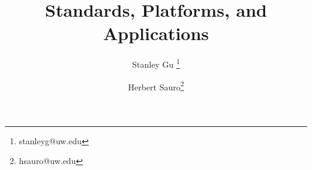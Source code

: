 \documentclass[]{article}
\title{Standards, Platforms, and Applications}
\author{Stanley Gu \footnote{stanleyg@uw.edu} \and Herbert Sauro\footnote{hsauro@uw.edu}}
\begin{document}
\maketitle

\newcommand{\bgamma}{\mbox{\boldmath $\Gamma$}}

\newcommand{\bL}{\mbox{\boldmath $L$}}

\newcommand{\bT}{\mbox{\boldmath $T$}}

\newcommand{\bI}{\mbox{\boldmath $I$}}

\newcommand{\bM}{\mbox{\boldmath $M$}}

\newcommand{\bm}{\mbox{\boldmath $m$}}

\newcommand{\bN}{\mbox{\boldmath $N$}}

\newcommand{\bE}{\mbox{\boldmath $E$}}

\newcommand{\bA}{\mbox{\boldmath $A$}}

\newcommand{\bB}{\mbox{\boldmath $B$}}

\newcommand{\bK}{\mbox{\boldmath $K$}}

\newcommand{\bP}{\mbox{\boldmath $P$}}

\newcommand{\bx}{\mbox{\boldmath $x$}}

\newcommand{\bU}{\mbox{\boldmath $U$}}

\newcommand{\bV}{\mbox{\boldmath $V$}}

\newcommand{\bZero}{\mbox{\boldmath $0$}}

\newcommand{\bLo}{\mbox{\boldmath $L_0$}}

\newcommand{\bNo}{\mbox{\boldmath $N_0$}}

\newcommand{\bNr}{\mbox{\boldmath $N_R$}}

\newcommand{\bSi}{\mbox{\boldmath $S_i$}}

\newcommand{\bSd}{\mbox{\boldmath $S_d$}}

\newcommand{\bdSi}{\mbox{\boldmath $dS_i$}}

\newcommand{\bdSd}{\mbox{\boldmath $dS_d$}}

\newcommand{\bS}{\mbox{\boldmath $S$}}

\newcommand{\bdS}{\mbox{\boldmath $dS$}}

\newcommand{\bdt}{\mbox{\boldmath $dt$}}

\newcommand{\bdSdt}{\mbox{$\displaystyle \frac{\bdS}{\bdt}$}}

\newcommand{\bdSddt}{\mbox{$\displaystyle \frac{\bdS_d}{\bdt}$}}

\newcommand{\bdSidt}{\mbox{$\displaystyle \frac{\bdS_i}{\bdt}$}}
\end{document}
